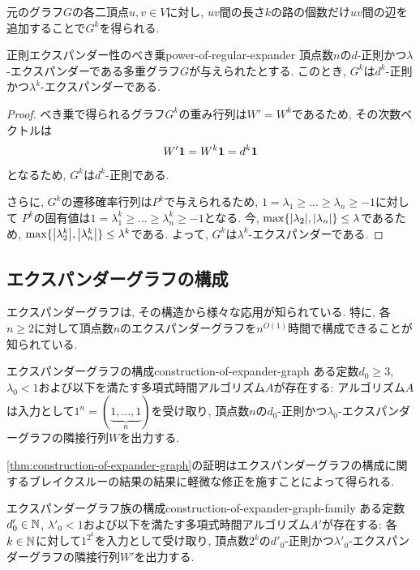 元のグラフ$G$の各二頂点$u,v\in V$に対し,
$uv$間の長さ$k$の路の個数だけ$uv$間の辺を追加することで$G^k$を得られる.

\begin{lemma}{正則エクスパンダー性のべき乗}{power-of-regular-expander}
  頂点数$n$の$d$-正則かつ$\lambda$-エクスパンダーである多重グラフ$G$が与えられたとする.
  このとき, $G^k$は$d^k$-正則かつ$\lambda^k$-エクスパンダーである.
\end{lemma}

\begin{proof}
  べき乗で得られるグラフ$G^k$の重み行列は$W'=W^k$であるため, その次数ベクトルは
  \begin{align*}
    W'\mathbf{1} = W^k\mathbf{1} = d^k\mathbf{1}
  \end{align*}
  となるため, $G^k$は$d^k$-正則である.

  さらに, $G^k$の遷移確率行列は$P^k$で与えられるため, $1=\lambda_1 \ge \dots \ge \lambda_n \ge -1$に対して
  $P^k$の固有値は$1=\lambda_1^k \ge \dots \ge \lambda_n^k \ge -1$となる.
  今, $\max\{\abs{\lambda_2}, \abs{\lambda_n}\} \le \lambda$であるため, $\max\{\abs{\lambda_2^k}, \abs{\lambda_n^k}\} \le \lambda^k$である.
  よって, $G^k$は$\lambda^k$-エクスパンダーである.
\end{proof}

\subsection{エクスパンダーグラフの構成}

エクスパンダーグラフは, その構造から様々な応用が知られている.
特に, 各$n\ge 2$に対して頂点数$n$のエクスパンダーグラフを$n^{O(1)}$時間で構成できることが知られている.

\begin{theorem}{エクスパンダーグラフの構成}{construction-of-expander-graph}
  ある定数$d_0\ge 3$, $\lambda_0<1$および以下を満たす多項式時間アルゴリズム$A$が存在する:
  アルゴリズム$A$は入力として$1^n=(\underbrace{1,\dots,1}_n)$を受け取り, 頂点数$n$の$d_0$-正則かつ$\lambda_0$-エクスパンダーグラフの隣接行列$W$を出力する.
\end{theorem}

\cref{thm:construction-of-expander-graph}の証明はエクスパンダーグラフの構成に関するブレイクスルーの結果\cite{ReingoldVW02}の結果に軽微な修正を施すことによって得られる.

\begin{theorem}{エクスパンダーグラフ族の構成}{construction-of-expander-graph-family}
  ある定数$d'_0\in\mathbb{N}$, $\lambda'_0<1$および以下を満たす多項式時間アルゴリズム$A'$が存在する:
  各$k\in \mathbb{N}$に対して$1^{2^k}$を入力として受け取り, 頂点数$2^k$の$d'_0$-正則かつ$\lambda'_0$-エクスパンダーグラフの隣接行列$W'$を出力する.
\end{theorem}

